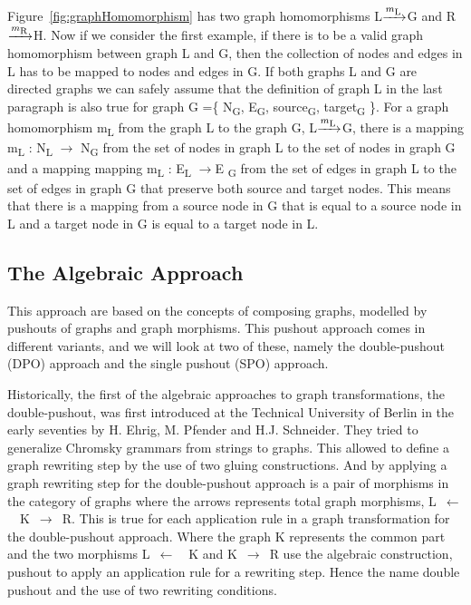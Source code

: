 Figure~\ref{fig:graphHomomorphism} has two graph homomorphisms
\mbox{L$\xrightarrow{m\textsubscript{L}}$G} and 
\mbox{R$\xrightarrow{m\textsubscript{R}}$H}. Now if we consider the first
example, if there is to be a valid graph homomorphism between graph L and G,
then the collection of nodes and edges in L has to be mapped to nodes and edges
in G. If both graphs L and G are directed graphs we can safely assume that the
definition of graph L in the last paragraph is also true for graph G =\{
N\textsubscript{G}, E\textsubscript{G}, source\textsubscript{G},
target\textsubscript{G} \}. For a graph homomorphism m\textsubscript{L} from the
graph L to the graph G, \mbox{L$\xrightarrow{m\textsubscript{L}}$G}, there is a
mapping m\textsubscript{L} : N\textsubscript{L} $\longrightarrow$
N\textsubscript{G} from the set of nodes in graph L to the set of nodes in
graph G and a mapping mapping m\textsubscript{L} : E\textsubscript{L}
$\longrightarrow$E \textsubscript{G} from the set of edges in graph L to the
set of edges in graph G that preserve both source and target nodes. This means
that there is a mapping from a source node in G that is equal to a source node
in L and a target node in G is equal to a target node in L. 

\subsection{The Algebraic Approach}
This approach are based on the concepts of composing graphs, modelled
by pushouts of graphs and graph morphisms. This pushout approach comes in
different variants, and we will look at two of these, namely the
double-pushout (DPO) approach and the single pushout (SPO)
approach\cite{Loewe1997,Ehrig1997}.

Historically, the first of the algebraic approaches to graph
transformations, the double-pushout, was first introduced at the Technical
University of Berlin in the early seventies by H. Ehrig, M. Pfender and H.J.
Schneider\cite{INSPEC:606170}. They tried to generalize Chromsky grammars from
strings to graphs. This allowed to define a graph rewriting step by the use of
two gluing constructions. And by applying a graph rewriting step for the
double-pushout approach is a pair of morphisms in the category of graphs where
the arrows represents total graph morphisms, \mbox{L $\longleftarrow$
\ K $\longrightarrow$ R}. This is true for each application rule in a graph
transformation for the double-pushout approach. Where the graph K represents the
common part and the two morphisms \mbox{L $\longleftarrow$ \ K} and \mbox{K
$\longrightarrow$ R} use the algebraic construction, pushout to apply an
application rule for a rewriting step. Hence the name double pushout and the use
of two rewriting conditions.

